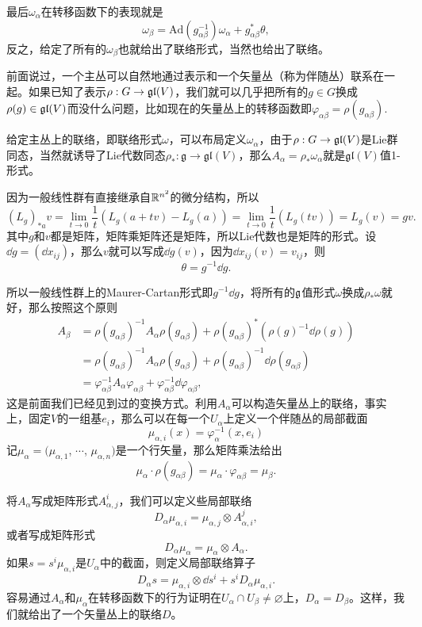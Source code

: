 最后$\omega_\alpha$在转移函数下的表现就是
\[
	\omega_\beta=\mathrm{Ad}(g_{\alpha\beta}^{-1})\omega_\alpha+g_{\alpha\beta}^*\theta,
\]
反之，给定了所有的$\omega_\beta$也就给出了联络形式，当然也给出了联络。

前面说过，一个主丛可以自然地通过表示和一个矢量丛（称为伴随丛）联系在一起。如果已知了表示$\rho:G\to \mathfrak{gl}(V)$，我们就可以几乎把所有的$g\in G$换成$\rho(g)\in \mathfrak{gl}(V)$而没什么问题，比如现在的矢量丛上的转移函数即$\varphi_{\alpha\beta}=\rho(g_{\alpha\beta})$.

给定主丛上的联络，即联络形式$\omega$，可以布局定义$\omega_\alpha$，由于$\rho:G\to \mathfrak{gl}(V)$是Lie群同态，当然就诱导了Lie代数同态$\rho_*:\mathfrak{g}\to \mathfrak{gl}(V)$，那么$A_\alpha=\rho_*\omega_\alpha$就是$\mathfrak{gl}(V)$值1-形式。

因为一般线性群有直接继承自$\mathbb{R}^{n^2}$的微分结构，所以
\[
	(L_g)_{*a}v=\lim_{t\to 0}\frac{1}{t}(L_g(a+tv)-L_g(a))=\lim_{t\to 0}\frac{1}{t}(L_g(tv))=L_g(v)=gv.
\]
其中$g$和$v$都是矩阵，矩阵乘矩阵还是矩阵，所以Lie代数也是矩阵的形式。设$\dd g=(\dd x_{ij})$，那么$v$就可以写成$\dd g(v)$，因为$\dd x_{ij}(v)=v_{ij}$，则
\[
	\theta=g^{-1}\dd g.
\]

所以一般线性群上的Maurer-Cartan形式即$g^{-1}\dd g$，将所有的${\mathfrak{g}}$值形式$\omega$换成$\rho_*\omega$就好，那么按照这个原则
\begin{align*}
	A_\beta&=\rho(g_{\alpha\beta})^{-1}A_\alpha\rho(g_{\alpha\beta})+\rho(g_{\alpha\beta})^*\left(\rho(g)^{-1}\dd \rho(g)\right)\\
	&=\rho(g_{\alpha\beta})^{-1}A_\alpha\rho(g_{\alpha\beta})+\rho(g_{\alpha\beta})^{-1}\dd \rho(g_{\alpha\beta})\\
	&=\varphi_{\alpha\beta}^{-1}A_\alpha\varphi_{\alpha\beta}+\varphi_{\alpha\beta}^{-1}\dd \varphi_{\alpha\beta},
\end{align*}
这是前面我们已经见到过的变换方式。利用$A_\alpha$可以构造矢量丛上的联络，事实上，固定$V$的一组基$e_i$，那么可以在每一个$U_\alpha$上定义一个伴随丛的局部截面
\[
	\mu_{\alpha,i}(x)=\varphi_\alpha^{-1}(x,e_i)
\]
记$\mu_\alpha=(\mu_{\alpha,1}$, $\cdots$, $\mu_{\alpha,n})$是一个行矢量，那么矩阵乘法给出
\[
	\mu_\alpha\cdot \rho(g_{\alpha\beta})=\mu_\alpha\cdot \varphi_{\alpha\beta}=\mu_\beta.
\]

将$A_\alpha$写成矩阵形式$A^i_{\alpha,j}$，我们可以定义些局部联络
\[
	D_\alpha\mu_{\alpha,i}=\mu_{\alpha,j}\otimes A^j_{\alpha,i},
\]
或者写成矩阵形式
\[
	D_\alpha\mu_{\alpha}=\mu_{\alpha}\otimes A_\alpha.
\]
如果$s=s^i\mu_{\alpha,i}$是$U_\alpha$中的截面，则定义局部联络算子
\[
	D_\alpha s=\mu_{\alpha,i}\otimes \dd s^i+s^iD_\alpha\mu_{\alpha,i}.
\]
容易通过$A_\alpha$和$\mu_\alpha$在转移函数下的行为证明在$U_\alpha\cap U_\beta\neq \varnothing$上，$D_\alpha=D_\beta$。这样，我们就给出了一个矢量丛上的联络$D$。


